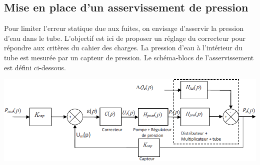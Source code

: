 \documentclass[10pt,fleqn]{article} %
\begin{document}
\begin{multicols}{2}
\begin{corrige}
\end{corrige}
\else
\fi
%
%
%
%

\subsection*{Mise en place d'un asservissement de pression}


\ifprof
\else
Pour limiter l’erreur statique due aux fuites, on envisage d’asservir la pression d’eau dans le tube. L’objectif est ici de proposer un réglage du correcteur pour répondre aux critères du cahier des charges.
La pression d’eau à l’intérieur du tube est mesurée par un capteur de pression. Le schéma-blocs de l’asservissement est défini ci-dessous.

\begin{center}
\includegraphics[width=\linewidth]{images_02/fig_06}
\end{center}


\end{multicols}
\end{document}
